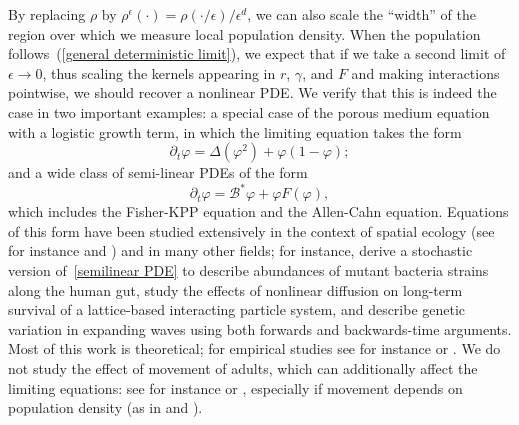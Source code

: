 \documentclass[EJP]{ejpecp} %
\newcommand{\DG}{\mathcal{B}}  %
\newcommand{\citet}[1]{\cite{#1}}
\begin{document}
By replacing $\rho$ by
$\rho^\epsilon(\cdot)=\rho(\cdot/\epsilon)/\epsilon^d$, 
we can also scale the ``width'' of the 
region over which we measure local population density. 
When the population follows~(\ref{general deterministic limit}), 
we expect that if we take a second limit of $\epsilon \to 0$,
thus scaling the kernels appearing in $r$, $\gamma$, and $F$ and making interactions pointwise,
we should recover a nonlinear PDE.
We verify that this is indeed the case in two important examples:
a special case of the porous medium equation with a logistic growth term, in which
the limiting equation takes the form 
\begin{equation}
	\label{PME1}
	\partial_t \varphi = \Delta (\varphi^2)+\varphi(1-\varphi);
\end{equation}
and a wide class of semi-linear PDEs of the form 
\begin{equation}
\label{semilinear PDE}
\partial_t \varphi = \DG^*\varphi+ \varphi F(\varphi),
\end{equation}
which includes the Fisher-KPP equation and the Allen-Cahn equation.
Equations of this form have been studied extensively
in the context of spatial ecology
(see for instance \citet{lam2023introduction} and \citet{cantrell2004spatial})
and in many other fields;
for instance, \citet{ghosh2022emergent}
derive a stochastic version of~\eqref{semilinear PDE} to describe abundances of mutant bacteria strains
along the human gut,
\citet{li/buenzli/simpson:2022} study the effects of nonlinear diffusion
on long-term survival of a lattice-based interacting particle system,
and \citet{birzu/hallatschek/korolev:2017} describe genetic variation in expanding waves
using both forwards and backwards-time arguments.
Most of this work is theoretical; for empirical studies see for instance
\citet{adler2018interspecific} or \citet{zhu2023density}.
We do not study the effect of movement of adults,
which can additionally affect the limiting equations:
see for instance \citet{holmes/lewis/banks/veit:1994} or \citet{potts/borger:2023},
especially if movement depends on population density
(as in \citet{perkins:1992} and \citet{birzu2019genetic}).
\end{document}
